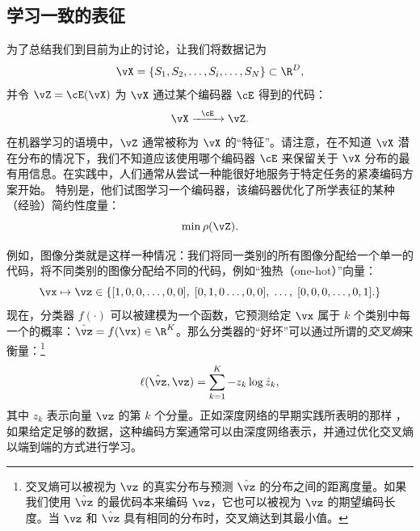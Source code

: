 \documentclass[../../book-main_zh.tex]{subfiles}
\begin{document}
\subsection{学习一致的表征}

\label{sec:consistency}

为了总结我们到目前为止的讨论，让我们将数据记为
\begin{equation}
    \vX = \{S_{1}, S_{2}, \ldots, S_{i}, \ldots, S_{N}\} \subset \R^{D},
\end{equation}
并令 \(\vZ = \cE(\vX)\) 为 \(\vX\) 通过某个编码器 \(\cE\) 得到的代码：
\begin{equation}
    \vX  \xrightarrow{\hspace{2mm} \cE\hspace{2mm}} \vZ.
    \label{eqn:open-loop}
\end{equation}
在机器学习的语境中，\(\vZ\) 通常被称为 \(\vX\) 的“特征”。请注意，在不知道 \(\vX\)
潜在分布的情况下，我们不知道应该使用哪个编码器 \(\cE\) 来保留关于 \(\vX\)
分布的最有用信息。在实践中，人们通常从尝试一种能很好地服务于特定任务的紧凑编码方案开始。
特别是，他们试图学习一个编码器，该编码器优化了所学表征的某种（经验）简约性度量：
\begin{equation}
    \min \rho(\vZ).
\end{equation}

\begin{example}\label{example:image_classification_feature_learning}
    例如，图像分类就是这样一种情况：我们将同一类别的所有图像分配给一个单一的代码，将不同类别的图像分配给不同的代码，例如“独热（one-hot）”向量：
    \begin{equation}
        \vx \mapsto \vz \in \{  [1, 0, 0, \ldots , 0, 0], \;  [0, 1,
        0 \ldots, 0, 0], \; \ldots, \;  [0,0,0, \ldots, 0, 1].\}
        \label{eqn:class-labels}
    \end{equation}
    现在，分类器 \(f(\cdot)\) 可以被建模为一个函数，它预测给定 \(\vx\) 属于 \(k\)
    个类别中每一个的概率：\(\hat{\vz} = f(\vx) \in
    \R^{K}\)。那么分类器的“好坏”可以通过所谓的{\em 交叉熵}来衡量：\footnote{交叉熵可以被视为 \(\vz\)
        的真实分布与预测 \(\hat{\vz}\) 的分布之间的距离度量。如果我们使用 \(\hat{\vz}\) 的最优码本来编码
        \(\vz\)，它也可以被视为 \(\vz\) 的期望编码长度。当 \(\vz\) 和 \(\hat{\vz}\)
    具有相同的分布时，交叉熵达到其最小值。}
    \begin{equation}
        \ell(\hat{\vz}, \vz) = \sum_{k=1}^{K} - z_{k} \log \hat{z}_{k},
    \end{equation}
    其中 \(z_{k}\) 表示向量 \(\vz\) 的第 \(k\) 个分量。正如深度网络的早期实践所表明的那样
    \cite{krizhevsky2012imagenet}，如果给定足够的数据，这种编码方案通常可以由深度网络表示，并通过优化交叉熵以端到端的方式进行学习。
\end{example}
\end{document}
